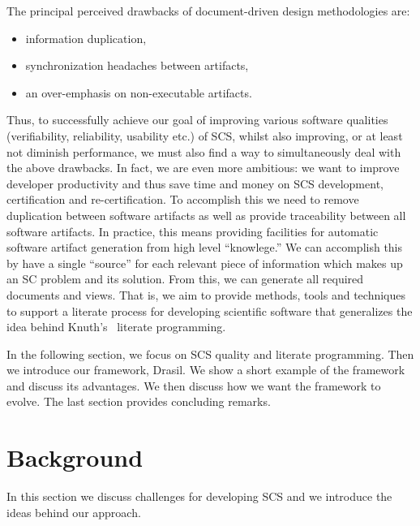 \documentclass{sig-alternate-05-2015}
\newcommand{\lss}{Drasil}
\begin{document}
The principal perceived drawbacks of document-driven design methodologies are:
\begin{itemize}
\setlength{\itemsep}{0.0em}
\setlength{\parskip}{0pt}
\setlength{\parsep}{0pt}
\item information duplication,
\item synchronization headaches between artifacts,
\item an over-emphasis on non-executable artifacts.
\end{itemize}

Thus, to successfully achieve our goal of improving various software qualities
(verifiability, reliability, usability etc.) of SCS, whilst also improving,
or at least not diminish performance, we must also find a way to simultaneously
deal with the above drawbacks.  In fact, we are even more ambitious: we want
to improve developer productivity and thus save time and money on SCS development,
certification and re-certification. To accomplish this we need to remove
duplication between software artifacts \cite{WilsonEtAl2013} as well as provide
traceability between all software artifacts. In practice, this means providing
facilities for automatic software artifact generation from high level
``knowlege.'' We can accomplish this by have a single ``source'' for each
relevant piece of information which makes up an SC problem and its solution.
From this, we can generate all required documents and views.
That is, we aim to provide methods, tools and techniques to support a literate
process for developing scientific software that generalizes the idea behind
Knuth's~\cite{Knuth1984} literate programming.

In the following section, we  
focus on SCS quality and literate programming.
Then we introduce our framework, \lss{}.  We show
a short example of the framework and discuss its advantages. 
We then discuss how we want the framework to evolve. %
The last section provides concluding remarks.

\section{Background} \label{sec:background}

In this section we discuss challenges for developing SCS and we
introduce the ideas behind our approach.
\end{document}
